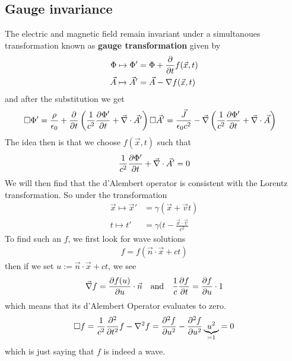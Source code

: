 \subsection{Gauge invariance}
The electric and magnetic field remain invariant under a simultanoues transformation known as \textbf{gauge transformation} given by
\begin{align*}
  \Phi \mapsto  \Phi' &= \Phi + \frac{\partial }{\partial t}f(\vec{x},t)\\
  \vec{A} \mapsto \vec{A}' &= \vec{A} - \nabla f(\vec{x},t)
\end{align*}
and after the substitution we get
\begin{align*}
  \square \Phi'  
  &= 
  \frac{\rho}{\epsilon_0} + \frac{\partial }{\partial t} \left(
    \frac{1}{c^{2}} \frac{\partial \Phi'}{\partial t} + \vec{\nabla} \cdot \vec{A}'
  \right)
  \square \vec{A}' = \frac{\vec{J}}{\epsilon_0 c^{2}} - \vec{\nabla} \left(
    \frac{1}{c^{2}} \frac{\partial \Phi'}{\partial t} + \vec{\nabla} \cdot \vec{A}
  \right)
\end{align*}
The idea then is that we choose $f(\vec{x},t)$ such that
\begin{align*}
  \frac{1}{c^{2}}\frac{\partial \Phi'}{\partial t} + \vec{\nabla} \cdot \vec{A}' = 0
\end{align*}
We will then find that the d'Alembert operator is consistent with the Lorentz transformation. So under the transformation
\begin{align*}
  \vec{x} \mapsto \vec{x}' &= \gamma(\vec{x} + \vec{v}t )\\
  t \mapsto t' &= \gamma(t - \frac{\vec{x} \cdot \vec{v}}{c^{2}}
\end{align*}
To find such an $f$, we first look for wave solutions
\begin{align*}
  f = f(\vec{n} \cdot \vec{x} + ct)
\end{align*}
then if we set $u := \vec{n} \cdot \vec{x} + ct$, we see
\begin{align*}
  \vec{\nabla}f = \frac{\partial f(u)}{\partial u}  \cdot \vec{n} \quad \text{and} \quad \frac{1}{c}\frac{\partial f}{\partial t} = \frac{\partial f}{\partial u} \cdot 1
\end{align*}
which means that its d'Alembert Operator evaluates to zero.
\begin{align*}
  \square f 
  = 
  \frac{1}{c^{2}} \frac{\partial^{2}}{\partial t^{2}}f - \nabla^{2}f 
  = 
  \frac{\partial^{2}f}{\partial u^{2}} - \frac{\partial^{2}f}{\partial u^{2}} \underbrace{u^{2}}_{=1} 
    = 0
\end{align*}
which is just saying that $f$ is indeed a wave.

